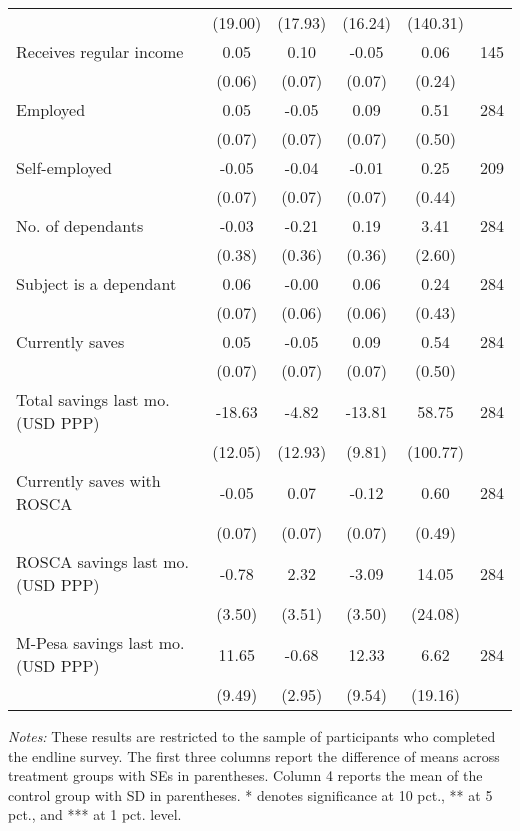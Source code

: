 \begin{table}[h]
{\begin{threeparttable}
\begin{tabular}{l*{5}{c}}
          &  (19.00)&  (17.93)&  (16.24)& (140.31)&         \\
Receives regular income&     0.05&     0.10&    -0.05&     0.06&      145\\
          &   (0.06)&   (0.07)&   (0.07)&   (0.24)&         \\
Employed  &     0.05&    -0.05&     0.09&     0.51&      284\\
          &   (0.07)&   (0.07)&   (0.07)&   (0.50)&         \\
Self-employed&    -0.05&    -0.04&    -0.01&     0.25&      209\\
          &   (0.07)&   (0.07)&   (0.07)&   (0.44)&         \\
No. of dependants&    -0.03&    -0.21&     0.19&     3.41&      284\\
          &   (0.38)&   (0.36)&   (0.36)&   (2.60)&         \\
Subject is a dependant&     0.06&    -0.00&     0.06&     0.24&      284\\
          &   (0.07)&   (0.06)&   (0.06)&   (0.43)&         \\
Currently saves&     0.05&    -0.05&     0.09&     0.54&      284\\
          &   (0.07)&   (0.07)&   (0.07)&   (0.50)&         \\
Total savings last mo. (USD PPP)&   -18.63&    -4.82&   -13.81&    58.75&      284\\
          &  (12.05)&  (12.93)&   (9.81)& (100.77)&         \\
Currently saves with ROSCA&    -0.05&     0.07&    -0.12&     0.60&      284\\
          &   (0.07)&   (0.07)&   (0.07)&   (0.49)&         \\
ROSCA savings last mo. (USD PPP)&    -0.78&     2.32&    -3.09&    14.05&      284\\
          &   (3.50)&   (3.51)&   (3.50)&  (24.08)&         \\
M-Pesa savings last mo. (USD PPP)&    11.65&    -0.68&    12.33&     6.62&      284\\
          &   (9.49)&   (2.95)&   (9.54)&  (19.16)&         \\
\bottomrule \end{tabular} \begin{tablenotes}[flushleft] \footnotesize \item \emph{Notes:} These results are restricted to the sample of participants who completed the endline survey. The first three columns report the difference of means across treatment groups with SEs in parentheses. Column 4 reports the mean of the control group with SD in parentheses. * denotes significance at 10 pct., ** at 5 pct., and *** at 1 pct. level. \end{tablenotes} \end{threeparttable} } \end{table}

